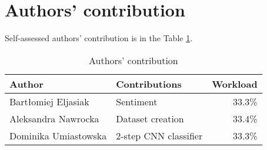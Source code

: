 \section{Authors' contribution}
Self-assessed authors' contribution is in the Table \ref{tab:contribution}.

\begin{table}[h]
\centering
\begin{tabularx}{0.5\textwidth}{XXr}
\textbf{Author} & \textbf{Contributions} & \textbf{Workload} \\\hline
Bartłomiej \mbox{Eljasiak} & Sentiment & 33.3\% \\\hline
Aleksandra Nawrocka & Dataset creation & 33.4\% \\\hline
Dominika \mbox{Umiastowska} & 2-step CNN classifier & 33.3\% \\
\end{tabularx}
\caption{Authors' contribution}
\label{tab:contribution}
\end{table}